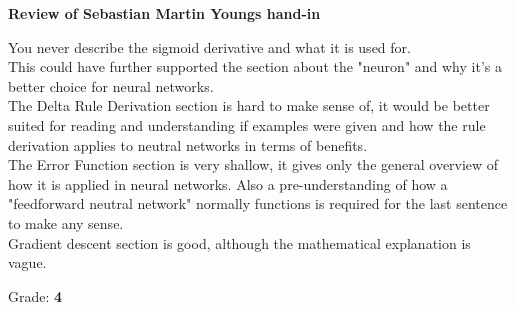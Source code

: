 \documentclass{article}
\begin{document}
\begin{center}
	\textbf{Review of Sebastian Martin Youngs hand-in}\\
\end{center}

You never describe the sigmoid derivative and what it is used for.\\This could have further supported the section about the "neuron" and why it's a better choice for neural networks.\\

The Delta Rule Derivation section is hard to make sense of, it would be better suited for reading and understanding if examples were given and how the rule derivation applies to neutral networks in terms of benefits.\\

The Error Function section is very shallow, it gives only the general overview of how it is applied in neural networks. Also a pre-understanding of how a "feedforward neutral network" normally functions is required for the last sentence to make any sense.\\

Gradient descent section is good, although the mathematical explanation is vague.

\begin{center}
	Grade: \textbf{4}
\end{center}
\end{document}
